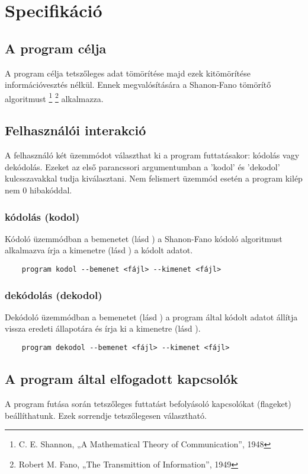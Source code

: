 \chapter{Specifikáció}

\section{A program célja}
A program célja tetszőleges adat tömörítése majd ezek kitömörítése információvesztés nélkül.
Ennek megvalósítására a Shanon-Fano tömörítő algoritmust
\footnote{C. E. Shannon, „A Mathematical Theory of Communication”, 1948}
\footnote{Robert M. Fano, „The Transmittion of Information”, 1949}
alkalmazza.

\section{Felhasználói interakció}
A felhasználó két üzemmódot választhat ki a program futtatásakor: kódolás vagy dekódolás. Ezeket az első parancssori argumentumban a 
'kodol' és 'dekodol' kulcsszavakkal tudja kiválasztani. Nem felismert üzemmód esetén a program kilép nem 0 hibakóddal.
\subsection{kódolás (kodol)}
\label{sec:encode}
Kódoló üzemmódban a bemenetet (lásd ) a Shanon-Fano kódoló algoritmust alkalmazva írja a kimenetre (lásd ) a kódolt adatot.
\begin{verbatim}
    program kodol --bemenet <fájl> --kimenet <fájl>
\end{verbatim}
\subsection{dekódolás (dekodol)}
\label{sec:decode}
Dekódoló üzemmódban a bemenetet (lásd ) a program által kódolt adatot állítja vissza eredeti állapotára és írja ki a kimenetre (lásd ).
\begin{verbatim}
    program dekodol --bemenet <fájl> --kimenet <fájl>
\end{verbatim}

\newpage
\section{A program által elfogadott kapcsolók}
\label{sec:flags}
A program futása során tetszőleges futtatást befolyásoló kapcsolókat (flageket) beállíthatunk.
Ezek sorrendje tetszőlegesen választható.
